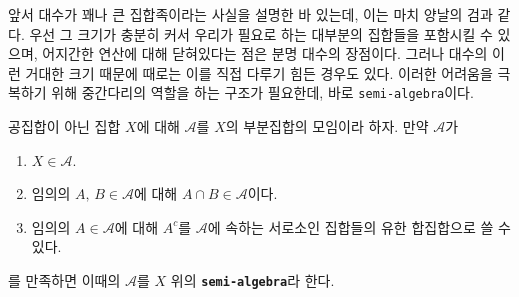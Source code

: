 
앞서 대수가 꽤나 큰 집합족이라는 사실을 설명한 바 있는데, 이는 마치 양날의 검과 같다. 우선 그 크기가 충분히 커서 우리가 필요로 하는 대부분의 집합들을 포함시킬 수 있으며, 어지간한 연산에 대해 닫혀있다는 점은 분명 대수의 장점이다. 그러나 대수의 이런 거대한 크기 때문에 때로는 이를 직접 다루기 힘든 경우도 있다. 이러한 어려움을 극복하기 위해 중간다리의 역할을 하는 구조가 필요한데, 바로 \texttt{semi-algebra}이다.

\begin{definition}
    공집합이 아닌 집합 $X$에 대해 $\mathcal{A}$를 $X$의 부분집합의 모임이라 하자. 만약 $\mathcal{A}$가
    \begin{enumerate}
        \item $X\in\mathcal{A}$.
        \item 임의의 $A,\,B\in\mathcal{A}$에 대해 $A\cap B\in\mathcal{A}$이다.
        \item 임의의 $A\in\mathcal{A}$에 대해 $A^c$를 $\mathcal{A}$에 속하는 서로소인 집합들의 유한 합집합으로 쓸 수 있다.
    \end{enumerate}
    를 만족하면 이때의 $\mathcal{A}$를 $X$ 위의 \textbf{\texttt{semi-algebra}}라 한다.
\end{definition}

